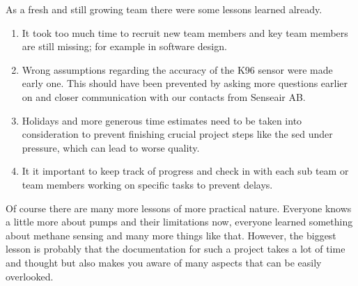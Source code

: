 As a fresh and still growing team there were some lessons learned already. 
\begin{enumerate}
  \item It took too much time to recruit new team members and key team members are still missing; for example in software design.
  \item Wrong assumptions regarding the accuracy of the K96 sensor were made early one. This should have been prevented by asking more questions earlier on and closer communication with our contacts from Senseair AB.
  \item Holidays and more generous time estimates need to be taken into consideration to prevent finishing crucial project steps like the \gls{sed} under pressure, which can lead to worse quality.
  \item It it important to keep track of progress and check in with each sub team or team members working on specific tasks to prevent delays.
\end{enumerate}
Of course there are many more lessons of more practical nature. Everyone knows a little more about pumps and their limitations now, everyone learned something about methane sensing and many more things like that. However, the biggest lesson is probably that the documentation for such a project takes a lot of time and thought but also makes you aware of many aspects that can be easily overlooked.

